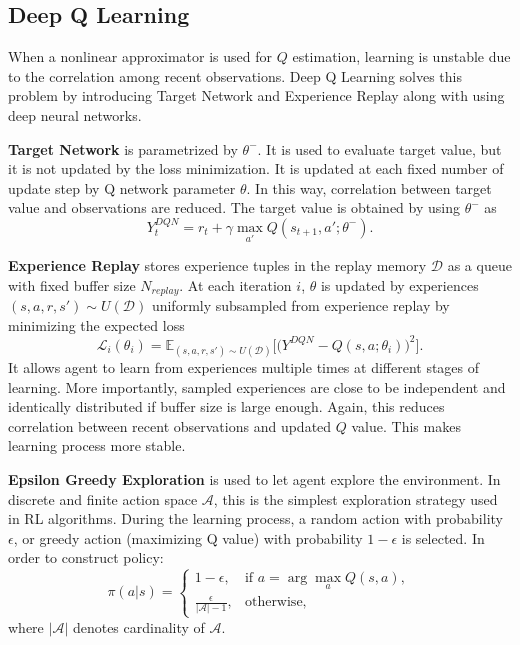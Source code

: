 \documentclass[a4paper, 12pt]{article} %
\begin{document}
\subsection{Deep Q Learning}
When a nonlinear approximator is used for $Q$ estimation, learning is unstable due to the correlation among recent observations. 
Deep Q Learning solves this problem by introducing Target Network and Experience Replay \cite{mnih_human-level_2015, mnih_playing_2013} along with using deep neural networks. 

\textbf{Target Network} is parametrized by $\theta^-$. 
It is used to evaluate target value, but it is not updated by the loss minimization. 
It is updated at each fixed number of update step by Q network parameter $\theta$. 
In this way, correlation between target value and observations are reduced.
The target value is obtained by using $\theta^-$ as
\begin{equation}
\label{eqn:dqn_ntarget}
Y_t^{DQN} = r_t + \gamma \max_{a'} Q(s_{t+1},a';\theta^-).
\end{equation}

\textbf{Experience Replay} stores experience tuples in the replay memory $\mathcal{D}$ as a queue with fixed buffer size $N_{replay}$. 
At each iteration $i$, $\theta$ is updated by experiences $(s,a,r,s')\sim U(\mathcal{D})$ uniformly subsampled from experience replay by minimizing the expected loss
\begin{equation}
\label{eqn:dqn_loss}
\mathcal{L}_i(\theta_i) = \mathbb{E}_{(s,a,r,s')\sim U(\mathcal{D})}\Big[\big( Y^{DQN} - Q(s,a;\theta_i) \big) ^ 2 \Big].
\end{equation}
It allows agent to learn from experiences multiple times at different stages of learning. 
More importantly, sampled experiences are close to be independent and identically distributed if buffer size is large enough. 
Again, this reduces correlation between recent observations and updated $Q$ value. This makes learning process more stable. 

\textbf{Epsilon Greedy Exploration} is used to let agent explore the environment. 
In discrete and finite action space $\mathcal{A}$, this is the simplest exploration strategy used in RL algorithms.
During the learning process, a random action with probability $\epsilon$, or greedy action (maximizing Q value) with probability $1-\epsilon$ is selected. 
In order to construct policy:   
\begin{equation}
\label{eqn:egreedy_policy}
\pi(a|s) = 
\begin{cases}
1-\epsilon,   & \text{if } a = \arg \max_{a} Q(s, a), \\
\frac{\epsilon}{|\mathcal{A}|-1},     & \text{otherwise},
\end{cases}
\end{equation}
where $|\mathcal{A}|$ denotes cardinality of $\mathcal{A}$. 
\end{document}
